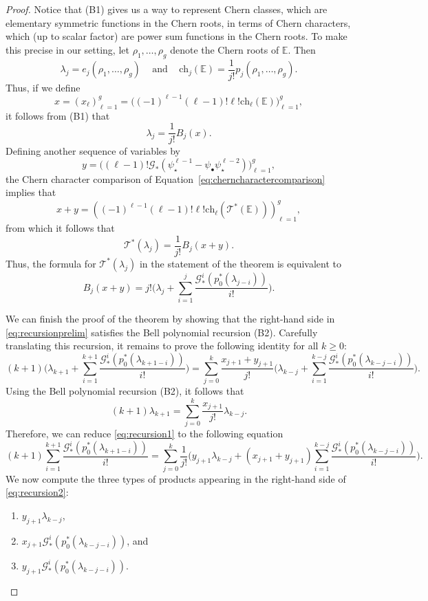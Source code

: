 \documentclass[12pt]{amsart}
\theoremstyle{definition}
\newcommand{\T}{\mathcal{T}}
\newcommand{\bE}{\mathbb{E}}
\newcommand{\G}{\mathcal{G}}
\newcommand{\ch}{\mathrm{ch}}
\numberwithin{equation}{section}
\begin{document}
\begin{proof}
Notice that (B1) gives us a way to represent Chern classes, which are elementary symmetric functions in the Chern roots, in terms of Chern characters, which (up to scalar factor) are power sum functions in the Chern roots. To make this precise in our setting, let $\rho_1,\dots,\rho_g$ denote the Chern roots of $\bE$. Then
\[
\lambda_j=e_j(\rho_1,\dots,\rho_g)\;\;\;\text{ and }\;\;\;\ch_j(\bE)=\frac{1}{j!}p_j(\rho_1,\dots,\rho_g).
\]
Thus, if we define
\[
x=(x_\ell)_{\ell=1}^g=\big((-1)^{\ell-1}(\ell-1)!\ell!\ch_\ell(\bE)\big)_{\ell=1}^g, 
\]
it follows from (B1) that
\[
\lambda_j=\frac{1}{j!}B_j(x).
\]
Defining another sequence of variables by 
\[
\displaystyle y=\big((\ell-1)!\G_*(\psi_\star^{\ell-1}-\psi_\bullet\psi_\star^{\ell-2})\big)_{\ell=1}^g, 
\]
the Chern character comparison of Equation~\eqref{eq:cherncharactercomparison} implies that
\[
x+y=((-1)^{\ell-1}(\ell-1)!\ell!\ch_\ell(\T^*(\bE)))_{\ell=1}^g,
\]
from which it follows that
\[
\T^*(\lambda_j)=\frac{1}{j!}B_j(x+y).
\]
Thus, the formula for $\T^*(\lambda_j)$ in the statement of the theorem is equivalent to 
\begin{equation}\label{eq:recursionprelim}
B_j(x+y)=j!\bigg(\lambda_j+\sum_{i=1}^j\frac{\G_*^{i}(p_0^*(\lambda_{j-i}))}{i!}\bigg).
\end{equation}

We can finish the proof of the theorem by showing that the right-hand side in \eqref{eq:recursionprelim} satisfies the Bell polynomial recursion (B2). Carefully translating this recursion, it remains to prove the following identity for all $k\geq 0$:
\begin{equation}\label{eq:recursion1}
(k+1)\bigg(\lambda_{k+1}+\sum_{i=1}^{k+1}\frac{\G_*^{i}(p_0^*(\lambda_{k+1-i}))}{i!}\bigg)=\sum_{j=0}^k\frac{x_{j+1}+y_{j+1}}{j!}\bigg(\lambda_{k-j}+\sum_{i=1}^{k-j}\frac{\G_*^{i}(p_0^*(\lambda_{k-j-i}))}{i!}\bigg).
\end{equation}
Using the Bell polynomial recursion (B2), it follows that
\begin{equation}\label{eq:brforlambda}
(k+1)\lambda_{k+1}=\sum_{j=0}^k\frac{x_{j+1}}{j!}\lambda_{k-j}.
\end{equation}
Therefore, we can reduce \eqref{eq:recursion1} to the following equation
\begin{equation}\label{eq:recursion2}
(k+1)\sum_{i=1}^{k+1}\frac{\G_*^{i}(p_0^*(\lambda_{k+1-i}))}{i!}=\sum_{j=0}^k\frac{1}{j!}\bigg(y_{j+1}\lambda_{k-j}+(x_{j+1}+y_{j+1})\sum_{i=1}^{k-j}\frac{\G_*^{i}(p_0^*(\lambda_{k-j-i}))}{i!}\bigg).
\end{equation}
We now compute the three types of products appearing in the right-hand side of \eqref{eq:recursion2}:
\begin{enumerate}
\item $y_{j+1}\lambda_{k-j}$,
\item $x_{j+1}\G_*^{i}(p_0^*(\lambda_{k-j-i}))$, and
\item $y_{j+1}\G_*^{i}(p_0^*(\lambda_{k-j-i}))$.
\end{enumerate}


\end{proof}
\end{document}
